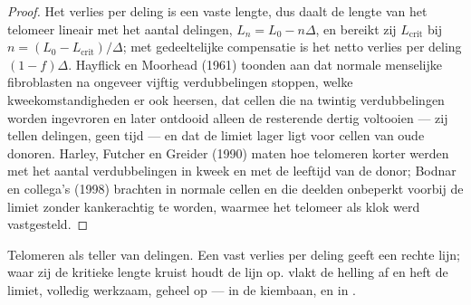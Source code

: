 \begin{proof}
Het verlies per deling is een vaste lengte, dus daalt de lengte van het
telomeer lineair met het aantal delingen, $L_{n} = L_{0} - n\Delta$, en
bereikt zij $L_{\text{crit}}$ bij $n = (L_{0} - L_{\text{crit}})/\Delta$;
met gedeeltelijke compensatie is het netto verlies per deling
$(1 - f)\Delta$. Hayflick en Moorhead (1961) toonden aan dat normale
menselijke fibroblasten na ongeveer vijftig verdubbelingen stoppen,
welke kweekomstandigheden er ook heersen, dat cellen die na twintig
verdubbelingen worden ingevroren en later ontdooid alleen de resterende
dertig voltooien --- zij tellen delingen, geen tijd --- en dat de
limiet lager ligt voor cellen van oude donoren. Harley, Futcher en
Greider (1990) maten hoe telomeren korter werden met het aantal
verdubbelingen in kweek en met de leeftijd van de donor; Bodnar en
collega's (1998) brachten  in normale cellen en die deelden
onbeperkt voorbij de limiet zonder kankerachtig te worden, waarmee het
telomeer als klok werd vastgesteld.
\end{proof}

\begin{omfigure}

{\small Telomeren als teller van delingen. Een vast verlies per deling
geeft een rechte lijn; waar zij de kritieke lengte kruist houdt de lijn
op.  vlakt de helling af en heft de limiet, volledig
werkzaam, geheel op --- in de kiembaan, en in .}
\end{omfigure}

